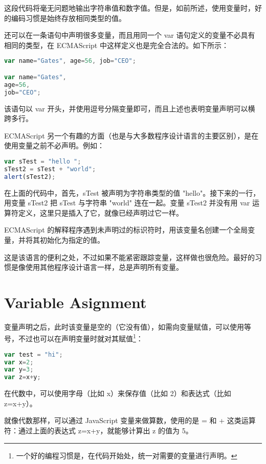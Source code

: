 这段代码将毫无问题地输出字符串值和数字值。但是，如前所述，使用变量时，好的编码习惯是始终存放相同类型的值。


还可以在一条语句中声明很多变量，而且用同一个 var 语句定义的变量不必具有相同的类型，在 ECMAScript 中这样定义也是完全合法的。如下所示：

\begin{lstlisting}[language=JavaScript]
var name="Gates", age=56, job="CEO";

var name="Gates",
age=56,
job="CEO";
\end{lstlisting}

该语句以 var 开头，并使用逗号分隔变量即可，而且上述也表明变量声明可以横跨多行。

ECMAScript 另一个有趣的方面（也是与大多数程序设计语言的主要区别），是在使用变量之前不必声明。例如：


\begin{lstlisting}[language=JavaScript]
var sTest = "hello ";
sTest2 = sTest + "world";
alert(sTest2);
\end{lstlisting}


在上面的代码中，首先，sTest 被声明为字符串类型的值 "hello"。接下来的一行，用变量 sTest2 把 sTest 与字符串 "world" 连在一起。变量 sTest2 并没有用 var 运算符定义，这里只是插入了它，就像已经声明过它一样。

ECMAScript 的解释程序遇到未声明过的标识符时，用该变量名创建一个全局变量，并将其初始化为指定的值。

这是该语言的便利之处，不过如果不能紧密跟踪变量，这样做也很危险。最好的习惯是像使用其他程序设计语言一样，总是声明所有变量。

\section{Variable Asignment}


变量声明之后，此时该变量是空的（它没有值），如需向变量赋值，可以使用等号，不过也可以在声明变量时就对其赋值\footnote{一个好的编程习惯是，在代码开始处，统一对需要的变量进行声明。}：

\begin{lstlisting}[language=JavaScript]
var test = "hi";
var x=2;
var y=3;
var z=x+y;
\end{lstlisting}



在代数中，可以使用字母（比如 x）来保存值（比如 2）和表达式（比如 z=x+y）。

就像代数那样，可以通过 JavaScript 变量来做算数，使用的是 = 和 + 这类运算符：通过上面的表达式 z=x+y，就能够计算出 z 的值为 5。

